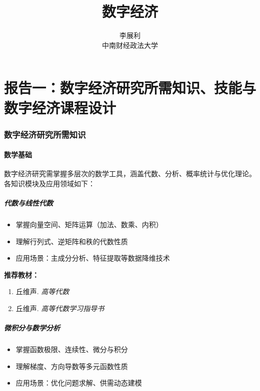 \documentclass[lang=cn,12pt,a4paper]{elegantpaper}
\title{数字经济}
\author{李展利 \\  中南财经政法大学}
\institute{\href{https://elegantlatex.org/}{Elegant\LaTeX{} 项目组}}
\date{}
\begin{document}

\newpage

\tableofcontents
\newpage  %
\part{报告一：数字经济研究所需知识、技能与数字经济课程设计}
\begin{abstract}

\end{abstract}
\section{数字经济研究所需知识}
\subsection{数学基础}
数字经济研究需掌握多层次的数学工具，涵盖代数、分析、概率统计与优化理论。各知识模块及应用领域如下：

\subsubsection{代数与线性代数}
\begin{itemize}[leftmargin=*,noitemsep]
    \item 掌握向量空间、矩阵运算（加法、数乘、内积）
    \item 理解行列式、逆矩阵和秩的代数性质
    \item 应用场景：主成分分析、特征提取等数据降维技术
\end{itemize}

\noindent \textbf{推荐教材：}
\begin{enumerate}[leftmargin=*,nosep]
    \item 丘维声. \textit{高等代数}
    \item 丘维声. \textit{高等代数学习指导书}
\end{enumerate}

\subsubsection{微积分与数学分析}
\begin{itemize}[leftmargin=*,noitemsep]
    \item 掌握函数极限、连续性、微分与积分
    \item 理解梯度、方向导数等多元函数性质
    \item 应用场景：优化问题求解、供需动态建模
\end{itemize}
\end{document}
